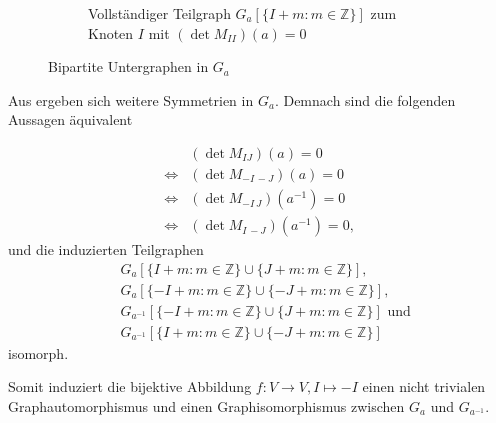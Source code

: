 \begin{figure}[]
\begin{subfigure}[b]{0.47\textwidth}
        \caption{Vollständiger Teilgraph ${G_a[\{I+m:m\in \mathbb{Z}\}]}$ zum Knoten $I$ mit $(\det M_{II})(a) = 0$}
        \label{fig:complete-graph}
    \end{subfigure}
    \caption{Bipartite Untergraphen in $G_a$}
    \label{fig:subgraphs}
\end{figure}

Aus  ergeben sich weitere Symmetrien in $G_a$. Demnach sind die folgenden Aussagen äquivalent

\begin{align*}
    &(\det{} M_{IJ})(a) = 0 \\
    \iff &(\det{} M_{-I\,-J})(a) = 0 \\
    \iff &(\det{} M_{-I\,J})(a^{-1}) = 0 \\
    \iff &(\det{} M_{I\,-J})(a^{-1}) = 0,
\end{align*}
und die induzierten Teilgraphen
\begin{align*}
    &G_a[\{I+m:m\in \mathbb{Z}\} \cup \{J+m:m\in \mathbb{Z}\}], \\
    &G_a[\{-I+m:m\in \mathbb{Z}\} \cup \{-J+m:m\in \mathbb{Z}\}], \\
    &G_{a^{-1}}[\{-I+m:m\in \mathbb{Z}\} \cup \{J+m:m\in \mathbb{Z}\}] \text{ und} \\
    &G_{a^{-1}}[\{I+m:m\in \mathbb{Z}\} \cup \{-J+m:m\in \mathbb{Z}\}]
\end{align*}
isomorph.

Somit induziert die bijektive Abbildung $f:V \to V, I \mapsto -I$ einen nicht trivialen Graphautomorphismus und einen Graphisomorphismus zwischen $G_a$ und $G_{a^{-1}}$.